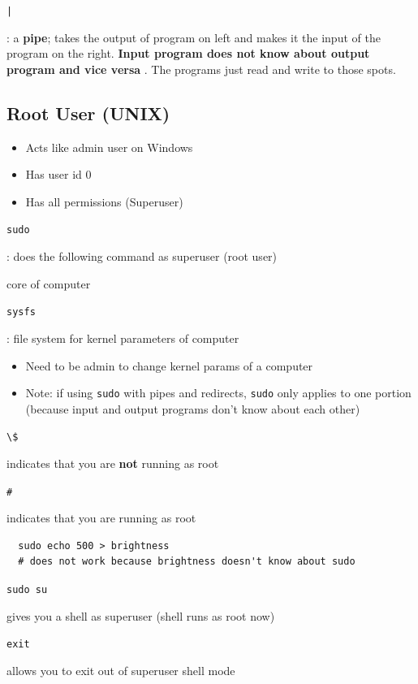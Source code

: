 \documentclass[letterpaper,12pt]{article}
\newcommand*{\lstitem}[1]{
  \setbox0\hbox{\lstinline{#1}}
  \item[\usebox0]
}
\begin{document}
\begin{description}
 \lstitem{|}: a \textbf{pipe}; takes the output of program on left and makes it the input of the program on the right. \textbf{Input program does not know about output program and vice versa} . The programs just read and write to those spots.
\end{description}

\subsection{Root User (UNIX)}
\begin{itemize}
 \item Acts like admin user on Windows
 \item Has user id 0
 \item Has all permissions (Superuser)
\end{itemize}

\begin{description}
 \lstitem{sudo}: does the following command as superuser (root user)
 \item[kernel:] core of computer
       \lstitem{sysfs}: file system for kernel parameters of computer
\end{description}

\begin{itemize}
 \item Need to be admin to change kernel params of a computer
 \item Note: if using \lstinline{sudo} with pipes and redirects, \lstinline{sudo} only applies to one portion (because input and output programs don't know about each other)
\end{itemize}

\begin{description}
 \lstitem{\$} indicates that you are \textbf{not} running as root
 \lstitem{#} indicates that you are running as root
\end{description}

\begin{lstlisting}
  sudo echo 500 > brightness
  # does not work because brightness doesn't know about sudo
\end{lstlisting}

\begin{description}
 \lstitem{sudo su} gives you a shell as superuser (shell runs as root now)
 \lstitem{exit} allows you to exit out of superuser shell mode
\end{description}
\end{document}
